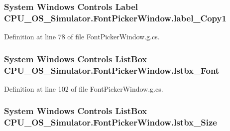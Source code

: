 \subsubsection[{label\+\_\+\+Copy1}]{\setlength{\rightskip}{0pt plus 5cm}System Windows Controls Label C\+P\+U\+\_\+\+O\+S\+\_\+\+Simulator.\+Font\+Picker\+Window.\+label\+\_\+\+Copy1\hspace{0.3cm}{\ttfamily [package]}}\label{class_c_p_u___o_s___simulator_1_1_font_picker_window_a8e7e6065c838bf76e919401eff15a2be}


Definition at line 78 of file Font\+Picker\+Window.\+g.\+cs.

\hypertarget{class_c_p_u___o_s___simulator_1_1_font_picker_window_a5ab20fca6d1149f954e66643491e3f0e}{}
\subsubsection[{lstbx\+\_\+\+Font}]{\setlength{\rightskip}{0pt plus 5cm}System Windows Controls List\+Box C\+P\+U\+\_\+\+O\+S\+\_\+\+Simulator.\+Font\+Picker\+Window.\+lstbx\+\_\+\+Font\hspace{0.3cm}{\ttfamily [package]}}\label{class_c_p_u___o_s___simulator_1_1_font_picker_window_a5ab20fca6d1149f954e66643491e3f0e}


Definition at line 102 of file Font\+Picker\+Window.\+g.\+cs.

\hypertarget{class_c_p_u___o_s___simulator_1_1_font_picker_window_a8d7855c50915b0975ee314de961c00d5}{}
\subsubsection[{lstbx\+\_\+\+Size}]{\setlength{\rightskip}{0pt plus 5cm}System Windows Controls List\+Box C\+P\+U\+\_\+\+O\+S\+\_\+\+Simulator.\+Font\+Picker\+Window.\+lstbx\+\_\+\+Size\hspace{0.3cm}{\ttfamily [package]}}\label{class_c_p_u___o_s___simulator_1_1_font_picker_window_a8d7855c50915b0975ee314de961c00d5}


